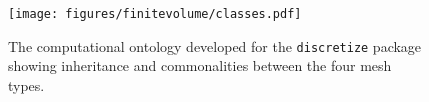 \begin{figure}[ht]
    \centering
    \texttt{[image: figures/finitevolume/classes.pdf]}
    \caption{
        The computational ontology developed for the \texttt{discretize} package showing inheritance and commonalities between the four mesh types.
    }
    \label{fig:finitevolume-classes}
\end{figure}
